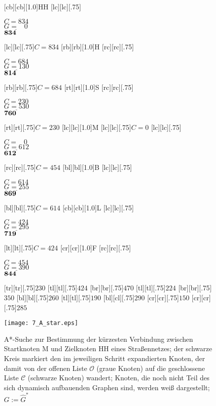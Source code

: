 \begin{figure}[h]
\newcommand{\cost}[3]{\parbox[t]{1.5cm}{\flushright $#1$ \\$\underline{#2}$ \\ $\bs{#3}$}}
\centering
\newcommand{\smallsize}{.75}
	[cb][cb][1.0]{HH}
		[lc][lc][\smallsize]{\cost{C\!=\!834}{G\!=\;\;\;0}{834}}
	[lc][lc][\smallsize]{$C\!=\!834$}
	[rb][rb][1.0]{H}
		[rc][rc][\smallsize]{\cost{C\!=\!684}{G\!=\!130}{814}}
	[rb][rb][\smallsize]{$C\!=\!684$}
	[rt][rt][1.0]{S}
	[rc][rc][\smallsize]{\cost{C\!=\!230}{G\!=\!530}{760}}
	[rt][rt][\smallsize]{$C\!=\!230$}
	[lc][lc][1.0]{M}
	[lc][lc][\smallsize]{$C\!=\!0$}
	[lc][lc][\smallsize]{\cost{C\!=\;\;\;0}{G\!=\!612}{612}}
	[rc][rc][\smallsize]{$C\!=\!454$}
	[bl][bl][1.0]{B}
	[lc][lc][\smallsize]{\cost{C\!=\!614}{G\!=\!255}{869}}
	[bl][bl][\smallsize]{$C\!=\!614$}
	[cb][cb][1.0]{L}
	[lc][lc][\smallsize]{\cost{C\!=\!424}{G\!=\!295}{719}}
	[lt][lt][\smallsize]{$C\!=\!424$}
	[cr][cr][1.0]{F}
	[rc][rc][\smallsize]{\cost{C\!=\!454}{G\!=\!390}{844}}
	[tr][tr][\smallsize]{$230$}
	[tl][tl][\smallsize]{$424$}
	[br][br][\smallsize]{$470$}
	[tl][tl][\smallsize]{$224$}
	[br][br][\smallsize]{$350$}
	[bl][bl][\smallsize]{$260$}
	[tl][tl][\smallsize]{$190$}
	[bl][cl][\smallsize]{$290$}
	[cr][cr][\smallsize]{$150$}
	[cr][cr][\smallsize]{$285$}
	
 \texttt{[image: 7\_A\_star.eps]}
	\caption[A*-Suche zur Bestimmung des kürzesten Wegs]{A*-Suche zur Bestimmung der kürzesten Verbindung zwischen Startknoten M und Zielknoten HH eines Straßennetzes; der schwarze Kreis markiert den im jeweiligen Schritt expandierten Knoten, der damit von der offenen Liste $\mathcal O$ (graue Knoten) auf die geschlossene Liste $\mathcal C$ (schwarze Knoten) wandert; Knoten, die noch nicht Teil des sich dynamisch aufbauenden Graphen sind, werden weiß dargestellt; $G := \hat {G}^\ast$}
	\label{fig:astar}
\end{figure} 

